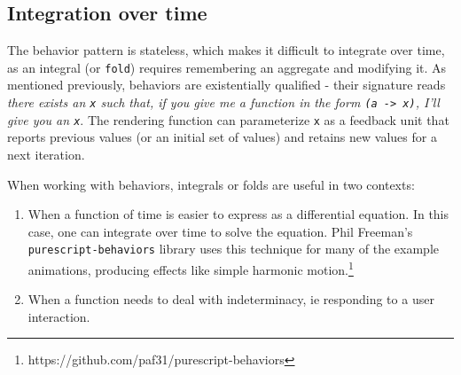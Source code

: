 \documentclass{sig-alternate}
\begin{document}
\begin{sloppypar}
\begin{figure}[h]
  \end{figure}

  \subsection{Integration over time}

  The behavior pattern is stateless, which makes it difficult to integrate over time, as an integral (or \verb=fold=) requires remembering an aggregate and modifying it.  As mentioned previously, behaviors are existentially qualified - their signature reads \textit{there exists an \texttt{x} such that, if you give me a function in the form \texttt{(a -> x)}, I'll give you an \texttt{x}}.  The rendering function can parameterize \texttt{x} as a feedback unit that reports previous values (or an initial set of values) and retains new values for a next iteration.

  When working with behaviors, integrals or folds are useful in two contexts:

  \begin{enumerate}
    \item When a function of time is easier to express as a differential equation.  In this case, one can integrate over time to solve the equation.  Phil Freeman's \texttt{purescript-behaviors} library uses this technique for many of the example animations, producing effects like simple harmonic motion.\footnote{https://github.com/paf31/purescript-behaviors}
    \item When a function needs to deal with indeterminacy, ie responding to a user interaction.
  \end{enumerate}


\end{sloppypar}
\end{document}
